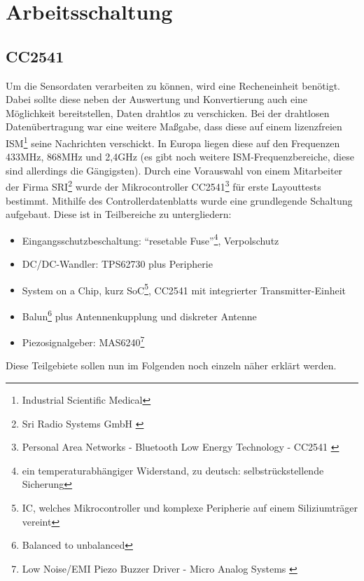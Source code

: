 \documentclass[12pt]{scrreprt} %
\begin{document}
\section{Arbeitsschaltung}
\subsection{CC2541}
\label{CC2541}
Um die Sensordaten verarbeiten zu können, wird eine Recheneinheit benötigt. Dabei sollte diese neben der Auswertung und Konvertierung auch eine Möglichkeit bereitstellen, Daten drahtlos zu verschicken. Bei der drahtlosen Datenübertragung war eine weitere Maßgabe, dass diese auf einem lizenzfreien ISM\footnote{Industrial Scientific Medical} seine Nachrichten verschickt. In Europa liegen diese auf den Frequenzen 433MHz, 868MHz und 2,4GHz (es gibt noch weitere ISM-Frequenzbereiche, diese sind allerdings die Gängigsten). Durch eine Vorauswahl von einem Mitarbeiter der Firma SRI\footnote{Sri Radio Systems GmbH \citep{sri}} wurde der Mikrocontroller CC2541\footnote{Personal Area Networks - Bluetooth Low Energy Technology - CC2541 \citep{TICC2541}} für erste Layouttests bestimmt. Mithilfe des Controllerdatenblatts \citep{CC2541} wurde eine grundlegende Schaltung aufgebaut. Diese ist in Teilbereiche zu untergliedern:
\begin{itemize}
\item
Eingangsschutzbeschaltung:  "`resetable Fuse"'\footnote{ein temperaturabhängiger Widerstand, zu deutsch: selbstrückstellende Sicherung}, Verpolschutz
\item
DC/DC-Wandler: TPS62730 plus Peripherie
\item
System on a Chip, kurz SoC\footnote{IC, welches Mikrocontroller und komplexe Peripherie auf einem Siliziumträger vereint}, CC2541 mit integrierter Transmitter-Einheit
\item
Balun\footnote{Balanced to unbalanced} plus Antennenkupplung und diskreter Antenne
\item
Piezosignalgeber: MAS6240\footnote{Low Noise/EMI Piezo Buzzer Driver - Micro Analog Systems \citep{MAS}} 
\end{itemize}
Diese Teilgebiete sollen nun im Folgenden noch einzeln näher erklärt werden.
\end{document}
